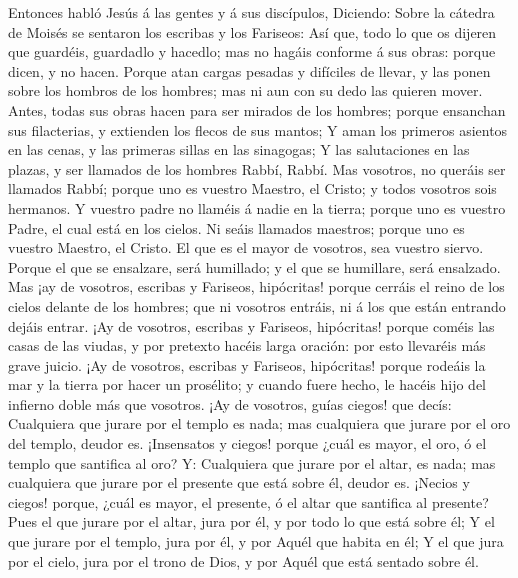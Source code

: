  Entonces habló Jesús á las gentes y á sus discípulos,
 Diciendo: Sobre la cátedra de Moisés se sentaron los
escribas y los Fariseos:  Así que, todo lo que os dijeren
que guardéis, guardadlo y hacedlo; mas no hagáis conforme á sus obras:
porque dicen, y no hacen.  Porque atan cargas pesadas y
difíciles de llevar, y las ponen sobre los hombros de los hombres; mas
ni aun con su dedo las quieren mover.  Antes, todas sus
obras hacen para ser mirados de los hombres; porque ensanchan sus
filacterias, y extienden los flecos de sus mantos;  Y aman
los primeros asientos en las cenas, y las primeras sillas en las
sinagogas;  Y las salutaciones en las plazas, y ser llamados
de los hombres Rabbí, Rabbí.  Mas vosotros, no queráis ser
llamados Rabbí; porque uno es vuestro Maestro, el Cristo; y todos
vosotros sois hermanos.  Y vuestro padre no llaméis á nadie
en la tierra; porque uno es vuestro Padre, el cual está en los cielos.
 Ni seáis llamados maestros; porque uno es vuestro Maestro,
el Cristo.  El que es el mayor de vosotros, sea vuestro
siervo.  Porque el que se ensalzare, será humillado; y el
que se humillare, será ensalzado.  Mas ¡ay de vosotros,
escribas y Fariseos, hipócritas! porque cerráis el reino de los cielos
delante de los hombres; que ni vosotros entráis, ni á los que están
entrando dejáis entrar.  ¡Ay de vosotros, escribas y
Fariseos, hipócritas! porque coméis las casas de las viudas, y por
pretexto hacéis larga oración: por esto llevaréis más grave juicio.
 ¡Ay de vosotros, escribas y Fariseos, hipócritas! porque
rodeáis la mar y la tierra por hacer un prosélito; y cuando fuere hecho,
le hacéis hijo del infierno doble más que vosotros.  ¡Ay de
vosotros, guías ciegos! que decís: Cualquiera que jurare por el templo
es nada; mas cualquiera que jurare por el oro del templo, deudor es.
 ¡Insensatos y ciegos! porque ¿cuál es mayor, el oro, ó el
templo que santifica al oro?  Y: Cualquiera que jurare por
el altar, es nada; mas cualquiera que jurare por el presente que está
sobre él, deudor es.  ¡Necios y ciegos! porque, ¿cuál es
mayor, el presente, ó el altar que santifica al presente? 
Pues el que jurare por el altar, jura por él, y por todo lo que está
sobre él;  Y el que jurare por el templo, jura por él, y
por Aquél que habita en él;  Y el que jura por el cielo,
jura por el trono de Dios, y por Aquél que está sentado sobre él.
